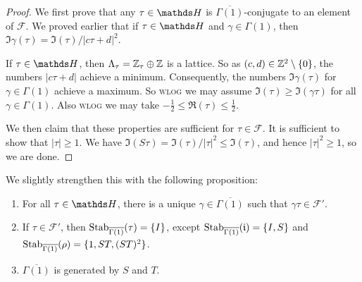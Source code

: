 \documentclass[10pt,a4paper]{article}
\begin{document}
\begin{proof}
  We first prove that any $\tau \in \H$ is $\overline{\Gamma(1)}$-conjugate to an element of $\mathscr{F}$. We proved earlier that if $\tau \in \H$ and $\gamma \in \Gamma(1)$, then $\Im \gamma(\tau) = \Im(\tau)/|c\tau+d|^2$.

  If $\tau \in \H$, then $\Lambda_\tau = \mathbb{Z}_\tau \oplus \mathbb{Z}$ is a lattice. So as $(c,d) \in \mathbb{Z}^2\setminus\{0\}$, the numbers $|c\tau+d|$ achieve a minimum. Consequently, the numbers $\Im \gamma(\tau)$ for $\gamma \in \Gamma(1)$ achieve a maximum. So \textsc{wlog} we may assume $\Im(\tau) \geq \Im(\gamma \tau)$ for all $\gamma \in \Gamma(1)$. Also \textsc{wlog} we may take $-\frac12 \leq \Re(\tau) \leq \frac12$.

  We then claim that these properties are sufficient for $\tau \in \mathscr{F}$. It is sufficient to show that $|\tau| \geq 1$. We have $\Im(S\tau) = \Im(\tau)/|\tau|^2 \leq \Im(\tau)$, and hence $|\tau|^2 \geq 1$, so we are done.
\end{proof}
We slightly strengthen this with the following proposition:
\begin{proposition}\hspace*{0cm}
  \begin{enumerate}
    \item For all $\tau \in \H$, there is a unique $\gamma \in \overline{\Gamma(1)}$ such that $\gamma \tau \in \mathscr{F}'.$
    \item If $\tau \in \mathscr{F}'$, then $\operatorname{Stab}_{\overline{\Gamma(1)}}(\tau) = \{I\}$, except $\operatorname{Stab}_{\overline{\Gamma(1)}}(\mathfrak{i}) = \{I, S\}$ and $\operatorname{Stab}_{\overline{\Gamma(1)}}(\rho) = \{1,ST,(ST)^2\}$.
    \item $\overline{\Gamma(1)}$ is generated by $S$ and $T$.
  \end{enumerate}
\end{proposition}
\end{document}
